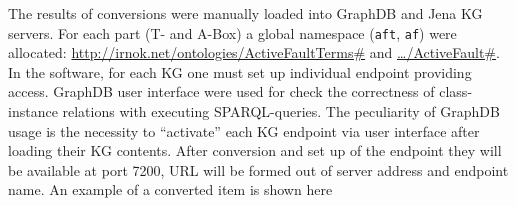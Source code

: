 \documentclass[
]{ceurart}
\begin{document}
The results of conversions were manually loaded into GraphDB and Jena KG servers.  For each part (T- and A-Box) a global namespace (\texttt{aft}, \texttt{af}) were allocated: \url{http://irnok.net/ontologies/ActiveFaultTerms\#} and \href{http://irnok.net/ontologies/ActiveFault\#}{\ldots/ActiveFault\#}.  In the software, for each KG one must set up individual endpoint providing access.  GraphDB user interface were used for check the correctness of class-instance relations with executing SPARQL-queries.  The peculiarity of GraphDB usage is the necessity to ``activate'' each KG endpoint via user interface after loading their KG contents.  After conversion and set up of the endpoint they will be available at port 7200, URL will be formed out of server address and endpoint name.  An example of a converted item is shown here
\end{document}
